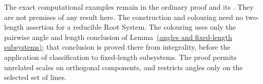 \begin{mergedproofsection}
The exact computational examples remain in the ordinary proof and its
. They are not premises of any result here.
The construction and colouring need no two-length assertion for a reducible
Root System. The colouring uses only the pairwise angle and length conclusion
of Lemma~\hyperref[lem:angles]{(angles and fixed-length subsystems)};
that conclusion is proved there from integrality, before the application
of classification to fixed-length subsystems.
The proof permits unrelated scales on orthogonal components, and
restricts angles only on the selected set of lines.
\end{mergedproofsection}
